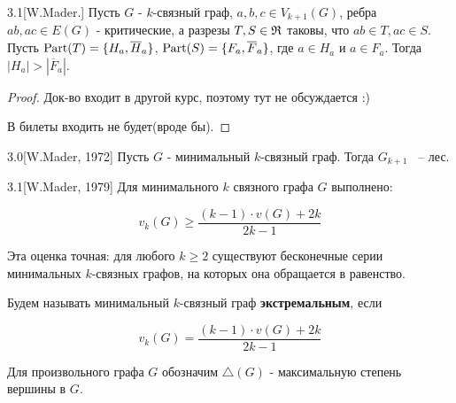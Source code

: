 \begin{customlm}{3.1}[W.Mader.] \label{lemma:3_1}
	Пусть $G$ -  $k$-связный граф,  $a, b, c \in V_{k + 1}(G)$, ребра  $ab, ac \in E(G)$ - критические, а разрезы  $T, S \in \mathfrak{R}$ таковы, что $ab \in T, ac \in S$.
	Пусть  $\operatorname{Part}(T) = \{H_a, \overline H_a\}$,  $\operatorname{Part}(S) = \{F_a, \overline F_a\}$, где  $a \in H_a$ и  $a \in F_a$.
		Тогда  $|H_a| > |\overline F_a|$.
\end{customlm}

\begin{proof}
	Док-во входит в другой курс, поэтому тут не обсуждается :)

	В билеты входить не будет(вроде бы).

\end{proof}

\begin{customthm}{3.0}[W.Mader, 1972] \label{theorem:3_0}
	Пусть $G$ - минимальный  $k$-связный граф.
	Тогда  $G_{k + 1}$ ~-- лес.
\end{customthm}



\begin{customthm}{3.1}[W.Mader, 1979] \label{theorem:3_1}
	Для минимального $k$ связного графа  $G$ выполнено:

	\[
		v_k(G) \geqslant \frac{(k - 1) \cdot v(G) + 2k}{2k - 1}
	\] 

\end{customthm}

Эта оценка точная: для любого $k \geqslant 2$ существуют бесконечные серии минимальных  $k$-связных графов, на которых она обращается в равенство.

\begin{df*}
	Будем называть минимальный $k$-связный граф \textbf{экстремальным}, если 

	 \[
		v_k(G) = \frac{(k - 1) \cdot v(G) + 2k}{2k - 1}
	\] 
\end{df*}

\begin{prop*}[$\triangle$]
	Для произвольного графа  $G$ обозначим  $\triangle(G)$ - максимальную степень вершины в  $G$.
\end{prop*}

